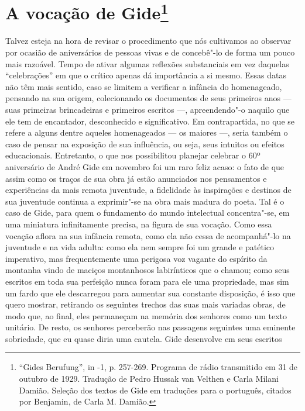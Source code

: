 \chapter{A vocação de Gide\footnote[*]{``Gides Berufung'', in -1, p. 257-269. Programa de rádio transmitido em 31 de outubro de 1929. Tradução de Pedro
  Hussak van Velthen e Carla Milani Damião. Seleção dos textos de Gide
  em traduções para o português, citados por Benjamin, de Carla M. Damião.}}

Talvez esteja na hora de revisar o procedimento que nós cultivamos ao
observar por ocasião de aniversários de pessoas vivas e de concebê"-lo de
forma um pouco mais razoável. Tempo de ativar algumas reflexões
substanciais em vez daquelas ``celebrações'' em que o crítico apenas
dá importância a si mesmo. Essas datas não têm mais sentido, caso se limitem a verificar a infância do homenageado, pensando na sua origem, colecionando os documentos de seus primeiros anos --- suas primeiras brincadeiras e primeiros escritos ---, apreendendo"-o naquilo que ele tem de encantador, desconhecido e significativo. Em
contrapartida, no que se refere a alguns dentre aqueles homenageados --- os maiores ---,
seria também o caso de pensar na exposição de sua influência, ou seja, seus intuitos ou
efeitos educacionais. Entretanto, o que nos possibilitou planejar celebrar o 60º aniversário de André Gide em novembro foi um raro feliz acaso: o fato de que assim como os traços de sua
obra já estão anunciados nos pensamentos e experiências da mais remota
juventude, a fidelidade às inspirações e destinos de sua
juventude continua a exprimir"-se na obra mais madura do poeta.
Tal é o caso de Gide, para quem o
fundamento do mundo intelectual concentra"-se,
em uma miniatura infinitamente precisa, na figura de sua vocação. Como essa
vocação aflora na sua infância remota, como ela não cessa de
acompanhá"-lo na juventude e na vida adulta: como ela nem sempre foi um grande e
patético imperativo, mas frequentemente uma perigosa voz vagante do
espírito da montanha vindo de maciços montanhosos
labirínticos que o chamou; como seus escritos em toda sua perfeição nunca foram para
ele uma propriedade, mas sim um fardo que ele descarregou para aumentar
sua constante disposição, é isso que quero mostrar, retirando os seguintes trechos das
suas mais variadas obras, de modo que, ao final,
eles permaneçam na memória dos senhores como um texto unitário. De
resto, os senhores perceberão nas passagens seguintes uma eminente
sobriedade, que eu quase diria uma cautela. Gide desenvolve em seus escritos
